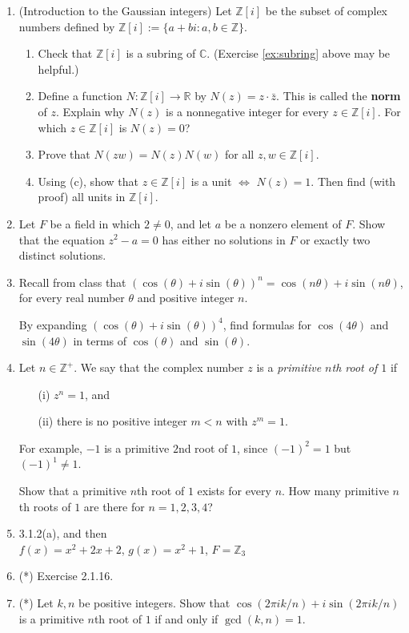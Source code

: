 \documentclass[11pt]{article}
\def\Z{\mathbb{Z}}
\def\R{\mathbb{R}}
\theoremstyle{plain}
\theoremstyle{remark}
\begin{document}
\begin{enumerate}
\item (Introduction to the Gaussian integers) Let $\Z[i]$ be the subset of complex numbers defined by $\Z[i]:= \{a+bi: a, b \in \Z\}$.
\begin{enumerate}
  \item Check that $\Z[i]$ is a subring of $\mathbb{C}$. (Exercise \ref{ex:subring} above may be helpful.)
  \item Define a function $N\colon \Z[i]\to\R$ by $N(z) = z\cdot \bar{z}$. This is called the \textbf{norm} of $z$. Explain why $N(z)$ is a nonnegative integer for every $z \in \Z[i]$. For which $z\in \Z[i]$ is $N(z)=0$?
 \item Prove that $N(zw) = N(z) N(w)$ for all $z, w \in \Z[i]$.
 \item Using (c), show that $z \in \Z[i]$ is a unit $\Longleftrightarrow$ $N(z)=1$. Then find (with proof) all units in $\Z[i]$.
\end{enumerate}

\item Let $F$ be a field in which $2\ne 0$, and let $a$ be a nonzero element of $F$. Show that the equation $z^2-a=0$ has either no solutions in $F$ or exactly two distinct solutions.
    
\item Recall from class that $(\cos(\theta)+i\sin(\theta))^n = \cos(n\theta) + i\sin(n\theta)$, for every real number $\theta$ and positive integer $n$.

By expanding $(\cos(\theta)+i\sin(\theta))^4$, find formulas for $\cos(4\theta)$ and $\sin(4\theta)$ in terms of $\cos(\theta)$ and $\sin(\theta)$.

\item Let $n \in \Z^{+}$. We say that the complex number $z$ is a \emph{primitive $n$th root of $1$} if
\begin{itemize}
\item[(i)] $z^n=1$, and
\item[(ii)] there is no positive integer $m < n$ with $z^m=1$.
\end{itemize} For example, $-1$ is a primitive $2$nd root of $1$, since $(-1)^2=1$ but $(-1)^1 \ne 1$.

Show that a primitive $n$th root of $1$ exists for every $n$. How many primitive $n$th roots of $1$ are there for $n=1,2,3,4$?

\item 3.1.2(a), and then \\
$f(x) = x^2+2x+2$, $g(x)=x^2+1$, $F=\Z_3$

\item (*) Exercise 2.1.16.

\item (*) Let $k, n$ be positive integers. Show that $\cos(2\pi i k/n) + i \sin (2\pi i k/n)$ is a primitive $n$th root of $1$ if and only if $\gcd(k,n)=1$. 

\end{enumerate}
\end{document}
